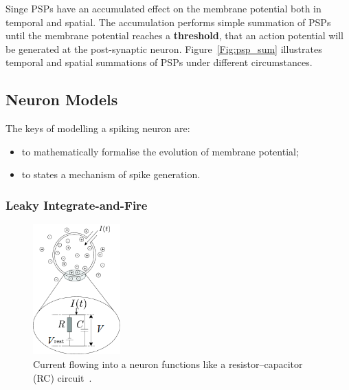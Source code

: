 Singe PSPs have an accumulated effect on the membrane potential both in temporal and spatial.
The accumulation performs simple summation of PSPs until the membrane potential reaches a \textbf{threshold}, that an action potential will be generated at the post-synaptic neuron.
Figure~\ref{Fig:psp_sum} illustrates temporal and spatial summations of PSPs under different circumstances.




\subsection{Neuron Models}
The keys of modelling a spiking neuron are: 
\begin{itemize}
	\item to mathematically formalise the evolution of membrane potential;
	\item to states a mechanism of spike generation.
\end{itemize}

\subsubsection{Leaky Integrate-and-Fire}
\begin{figure}[tb!]
	\centering
	\includegraphics[width=0.3\textwidth]{pics_snn/RC.png}
	\caption{Current flowing into a neuron functions like a resistor–capacitor (RC) circuit~\cite{gerstner2014neuronal}.}
	\label{Fig:rc}
\end{figure}

